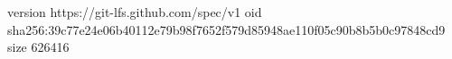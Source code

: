version https://git-lfs.github.com/spec/v1
oid sha256:39c77e24e06b40112e79b98f7652f579d85948ae110f05c90b8b5b0c97848cd9
size 626416
